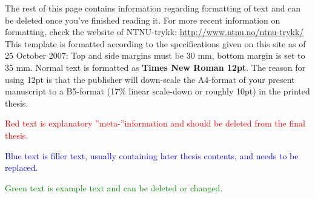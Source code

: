 The rest of this page contains information regarding formatting of text and can be deleted once you've finished reading 
it. For more recent information on formatting, check the website of NTNU-trykk: \url{http://www.ntnu.no/ntnu-trykk/} 
This template is formatted according to the specifications given on this site as of 25 October 2007: Top and side 
margins must be 30 mm, bottom margin is set to 35 mm. Normal text is formatted as \textbf{Times New Roman 12pt}. The 
reason for using 12pt is that the publisher will down-scale the A4-format of your present manuscript to a B5-format 
(17\% linear scale-down or roughly 10pt) in the printed thesis.

\textcolor{red}{Red text is explanatory ''meta-''information and should be deleted from the final thesis.}

\textcolor{blue}{Blue text is filler text, usually containing later thesis contents, and needs to be replaced.}

\textcolor{green}{Green text is example text and can be deleted or changed.}

